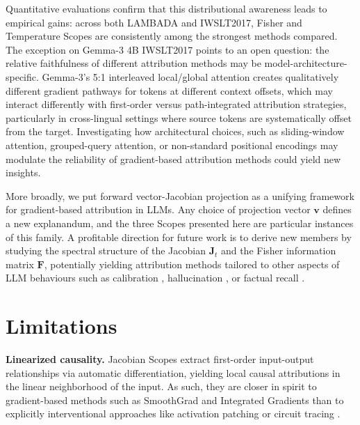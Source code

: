 \documentclass{article}
\begin{document}
Quantitative evaluations confirm that this distributional awareness leads to empirical gains: across both LAMBADA and IWSLT2017, Fisher and Temperature Scopes are consistently among the strongest methods compared.
The exception on Gemma-3 4B IWSLT2017 points to an open question: the relative faithfulness of different attribution methods may be model-architecture-specific.
Gemma-3's 5:1 interleaved local/global attention \citep{gemmateam2025gemma3technicalreport} creates qualitatively different gradient pathways for tokens at different context offsets, which may interact differently with first-order versus path-integrated attribution strategies, particularly in cross-lingual settings where source tokens are systematically offset from the target.
Investigating how architectural choices, such as sliding-window attention, grouped-query attention, or non-standard positional encodings may modulate the reliability of gradient-based attribution methods could yield new insights.

More broadly, we put forward vector-Jacobian projection as a unifying framework for gradient-based attribution in LLMs.
Any choice of projection vector $\bm{v}$ defines a new explanandum, and the three Scopes presented here are particular instances of this family.
A profitable direction for future work is to derive new members by studying the spectral structure of the Jacobian $\bm{J}_t$ and the Fisher information matrix $\bm{F}$, potentially yielding attribution methods tailored to other aspects of LLM behaviours
such as calibration \cite{guo2017calibration}, hallucination \cite{varshney2023stitch}, or factual recall \cite{meng2022locating}.

\section*{Limitations}
\textbf{Linearized causality.}
Jacobian Scopes extract first-order input-output relationships via automatic differentiation, yielding local causal attributions in the linear neighborhood of the input. 
As such, they are closer in spirit to gradient-based methods such as SmoothGrad \cite{smilkov2017smoothgradremovingnoiseadding} and Integrated Gradients \cite{Sundararajan-Axiomatic-Attribution-DNN-2017,sanyal2021discretizedintegratedgradientsexplaining} 
than to explicitly interventional approaches like activation patching \cite{heimersheim2024useinterpretactivationpatching,pmlr-v235-ghandeharioun24a} or circuit tracing \cite{ameisen2025circuit}.
\end{document}
